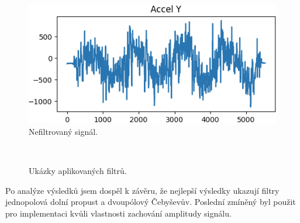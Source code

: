 \begin{figure}[!h]
	\centering
	\vspace{-5pt}
    \includegraphics[width = 0.7\linewidth]{Figures/NoFilter.png}
    \caption{Nefiltrovaný signál.}
    \label{fig:NoFilter}
    \vspace{-10pt}
\end{figure}

\begin{figure}[!h]
    \centering
	     \\
    \caption{Ukázky aplikovaných filtrů.}
    \label{fig:filters}
\end{figure}

Po analýze výsledků jsem dospěl k závěru, že nejlepší výsledky ukazují filtry
jednopolová dolní propust a dvoupólový Čebyševův. Poslední zmíněný byl použit pro
implementaci kvůli vlastnosti zachování amplitudy signálu.
\endinput
